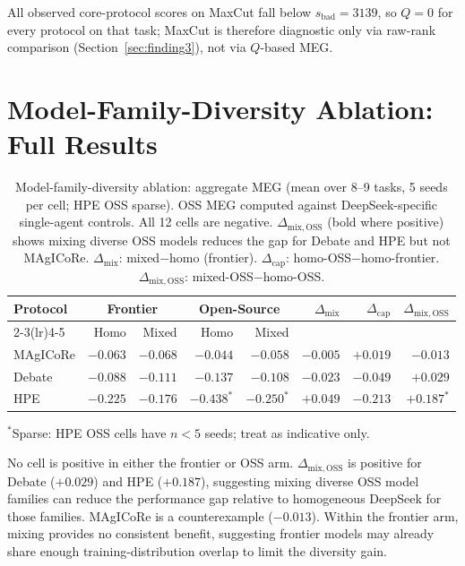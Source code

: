 \documentclass{article}
\begin{document}
All observed core-protocol scores on MaxCut fall below $s_\mathrm{bad}{=}3139$, so $Q{=}0$ for every protocol on that task; MaxCut is therefore diagnostic only via raw-rank comparison (Section~\ref{sec:finding3}), not via $Q$-based MEG.

\section{Model-Family-Diversity Ablation: Full Results}
\label{app:braindiv}

\begin{table}[h]
\caption{Model-family-diversity ablation: aggregate MEG (mean over 8--9 tasks, 5 seeds per cell; HPE OSS sparse). OSS MEG computed against DeepSeek-specific single-agent controls. All 12 cells are negative. $\Delta_\mathrm{mix,OSS}$ (bold where positive) shows mixing diverse OSS models reduces the gap for Debate and HPE but not MAgICoRe. $\Delta_\mathrm{mix}$: mixed$-$homo (frontier). $\Delta_\mathrm{cap}$: homo-OSS$-$homo-frontier. $\Delta_\mathrm{mix,OSS}$: mixed-OSS$-$homo-OSS.}
\label{tab:braindiv}
\centering
\small
\begin{tabular}{l r r r r r r r}
\toprule
Protocol & \multicolumn{2}{c}{Frontier} & \multicolumn{2}{c}{Open-Source} & $\Delta_\mathrm{mix}$ & $\Delta_\mathrm{cap}$ & $\Delta_\mathrm{mix,OSS}$ \\
\cmidrule(lr){2-3}\cmidrule(lr){4-5}
 & Homo & Mixed & Homo & Mixed & & & \\
\midrule
MAgICoRe & $-0.063$ & $-0.068$ & $-0.044$ & $-0.058$ & $-0.005$ & $+0.019$ & $-0.013$ \\
Debate   & $-0.088$ & $-0.111$ & $-0.137$ & $-0.108$ & $-0.023$ & $-0.049$ & $\mathbf{+0.029}$ \\
HPE      & $-0.225$ & $-0.176$ & $-0.438^*$ & $-0.250^*$ & $+0.049$ & $-0.213$ & $\mathbf{+0.187}^*$ \\
\bottomrule
\end{tabular}

\smallskip\noindent\small $^*$Sparse: HPE OSS cells have $n{<}5$ seeds; treat as indicative only.
\end{table}

No cell is positive in either the frontier or OSS arm. $\Delta_\mathrm{mix,OSS}$ is positive for Debate ($+0.029$) and HPE ($+0.187$), suggesting mixing diverse OSS model families can reduce the performance gap relative to homogeneous DeepSeek for those families. MAgICoRe is a counterexample ($-0.013$). Within the frontier arm, mixing provides no consistent benefit, suggesting frontier models may already share enough training-distribution overlap to limit the diversity gain.
\end{document}
